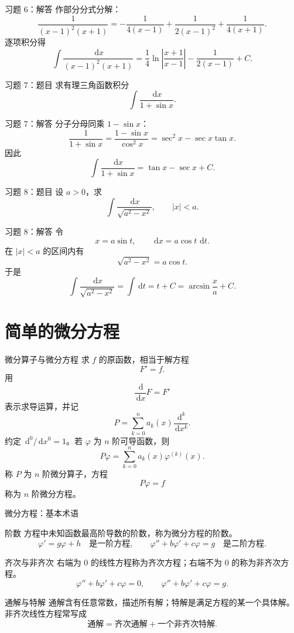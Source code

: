 \documentclass[aspectratio=169,10pt]{ctexbeamer}
\newcommand{\dd}{\,\mathrm{d}}
\begin{document}
\begin{frame}[t]{习题 6：解答}
\small
作部分分式分解：
\[
\frac1{(x-1)^2(x+1)}
=-\frac1{4(x-1)}+\frac1{2(x-1)^2}+\frac1{4(x+1)}.
\]
逐项积分得
\[
\boxed{
\int\frac{\dd x}{(x-1)^2(x+1)}
=\frac14\ln\left|\frac{x+1}{x-1}\right|
-\frac1{2(x-1)}+C.}
\]
\end{frame}

\begin{frame}[t]{习题 7：题目}
\small
求有理三角函数积分
\[
  \int\frac{\dd x}{1+\sin x}.
\]
\end{frame}

\begin{frame}[t]{习题 7：解答}
\small
分子分母同乘 $1-\sin x$：
\[
\frac1{1+\sin x}
=\frac{1-\sin x}{\cos^2x}
=\sec^2x-\sec x\tan x.
\]
因此
\[
\boxed{\int\frac{\dd x}{1+\sin x}
=\tan x-\sec x+C.}
\]
\end{frame}

\begin{frame}[t]{习题 8：题目}
\small
设 $a>0$，求
\[
  \int\frac{\dd x}{\sqrt{a^2-x^2}},
  \qquad |x|<a.
\]
\end{frame}

\begin{frame}[t]{习题 8：解答}
\small
令
\[
  x=a\sin t,\qquad \dd x=a\cos t\,\dd t.
\]
在 $|x|<a$ 的区间内有
\[
  \sqrt{a^2-x^2}=a\cos t.
\]
于是
\[
\int\frac{\dd x}{\sqrt{a^2-x^2}}
=\int\dd t=t+C
=\arcsin\frac{x}{a}+C.
\]
\end{frame}

\section{简单的微分方程}

\begin{frame}[t]{微分算子与微分方程}
\small
求 $f$ 的原函数，相当于解方程
\[
  F'=f.
\]
用
\[
  \frac{\dd}{\dd x}F=F'
\]
表示求导运算，并记
\[
  P=\sum_{k=0}^n a_k(x)\frac{\dd^k}{\dd x^k}.
\]
约定 $\dd^0/\dd x^0=1$。若 $\varphi$ 为 $n$ 阶可导函数，则
\[
  P\varphi=\sum_{k=0}^n a_k(x)\varphi^{(k)}(x).
\]
称 $P$ 为 $n$ 阶微分算子，方程
\[
  P\varphi=f
\]
称为 $n$ 阶微分方程。
\end{frame}

\begin{frame}[t]{微分方程：基本术语}
\footnotesize
\begin{block}{阶数}
方程中未知函数最高阶导数的阶数，称为微分方程的阶数。
\[
  \varphi'=g\varphi+h \quad\text{是一阶方程},
\qquad
  \varphi''+b\varphi'+c\varphi=g \quad\text{是二阶方程}.
\]
\end{block}

\begin{block}{齐次与非齐次}
右端为 $0$ 的线性方程称为齐次方程；右端不为 $0$ 的称为非齐次方程。
\[
  \varphi''+b\varphi'+c\varphi=0,
\qquad
  \varphi''+b\varphi'+c\varphi=g.
\]
\end{block}

\begin{block}{通解与特解}
通解含有任意常数，描述所有解；特解是满足方程的某一个具体解。非齐次线性方程常写成
\[
  \text{通解}=\text{齐次通解}+\text{一个非齐次特解}.
\]
\end{block}
\end{frame}
\end{document}
